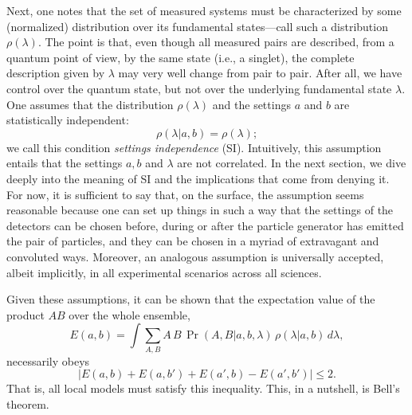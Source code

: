 \documentclass[letterpaper,12pt]{article}
\begin{document}
Next, one notes that the set of measured systems must be characterized by some (normalized) distribution over its fundamental states---call such a distribution $\rho(\lambda)$. The point is that, even though all measured pairs are described, from a quantum point of view, by the same state (i.e., a singlet), the complete description given by $\lambda$ may very well change from pair to pair. After all, we have control over the quantum state, but not over the underlying fundamental state $\lambda$. One assumes that the distribution $\rho(\lambda)$ and the settings $a$ and $b$ are statistically independent:
\begin{equation}\label{mi}
\rho(\lambda|a,b) = \rho(\lambda) ;
\end{equation}
we call this condition \emph{settings independence} (SI). Intuitively, this assumption entails that the settings $a,b$ and $\lambda$ are not correlated. In the next section, we dive deeply into the meaning of SI and the implications that come from denying it. For now, it is sufficient to say that, on the surface, the assumption seems reasonable because one can set up things in such a way that the settings of the detectors can be chosen before, during or after the particle generator has emitted the pair of particles, and they can be chosen in a myriad of extravagant and convoluted ways. Moreover, an analogous assumption is universally accepted, albeit implicitly, in all experimental scenarios across all sciences.

Given these assumptions, it can be shown that the expectation value of the product $AB$ over the whole ensemble,
\begin{equation} \label{expectation1}
E(a,b) = \int \sum_{A,B} A \, B \, \Pr(A,B|a,b,\lambda) \, \rho(\lambda|a,b) \, d\lambda,
\end{equation}
necessarily obeys
\begin{equation}
|E(a,b) + E(a,b') + E(a',b) - E(a',b')| \leq 2 .
\end{equation}
That is, all local models must satisfy this inequality. This, in a nutshell, is Bell's theorem.
\end{document}

